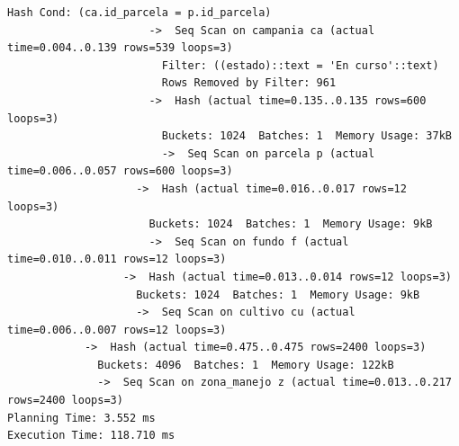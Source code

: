 \documentclass[11pt,letterpaper]{article}
\begin{document}
\begin{lstlisting}[style=plano]
                      Hash Cond: (ca.id_parcela = p.id_parcela)
                      ->  Seq Scan on campania ca (actual time=0.004..0.139 rows=539 loops=3)
                        Filter: ((estado)::text = 'En curso'::text)
                        Rows Removed by Filter: 961
                      ->  Hash (actual time=0.135..0.135 rows=600 loops=3)
                        Buckets: 1024  Batches: 1  Memory Usage: 37kB
                        ->  Seq Scan on parcela p (actual time=0.006..0.057 rows=600 loops=3)
                    ->  Hash (actual time=0.016..0.017 rows=12 loops=3)
                      Buckets: 1024  Batches: 1  Memory Usage: 9kB
                      ->  Seq Scan on fundo f (actual time=0.010..0.011 rows=12 loops=3)
                  ->  Hash (actual time=0.013..0.014 rows=12 loops=3)
                    Buckets: 1024  Batches: 1  Memory Usage: 9kB
                    ->  Seq Scan on cultivo cu (actual time=0.006..0.007 rows=12 loops=3)
            ->  Hash (actual time=0.475..0.475 rows=2400 loops=3)
              Buckets: 4096  Batches: 1  Memory Usage: 122kB
              ->  Seq Scan on zona_manejo z (actual time=0.013..0.217 rows=2400 loops=3)
Planning Time: 3.552 ms
Execution Time: 118.710 ms
\end{lstlisting}
\end{document}
